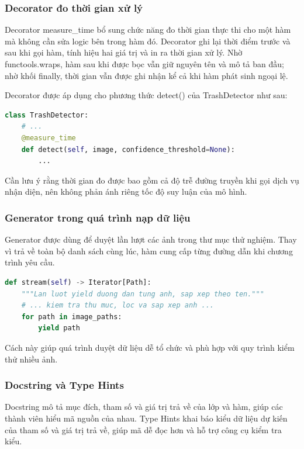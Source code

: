 \documentclass[a4paper,13pt]{extarticle}
\begin{document}
\subsubsection{ Decorator đo thời gian xử lý}

Decorator measure\_time bổ sung chức năng đo thời gian thực thi cho một hàm mà không cần sửa logic bên trong hàm đó. Decorator ghi lại thời điểm trước và sau khi gọi hàm, tính hiệu hai giá trị và in ra thời gian xử lý. Nhờ functools.wraps, hàm sau khi được bọc vẫn giữ nguyên tên và mô tả ban đầu; nhờ khối finally, thời gian vẫn được ghi nhận kể cả khi hàm phát sinh ngoại lệ.

Decorator được áp dụng cho phương thức detect() của TrashDetector như sau:

\begin{lstlisting}[language=Python, numbers=none, caption={Áp dụng Decorator measure\_time cho phương thức detect()}]
class TrashDetector:
    # ...
    @measure_time
    def detect(self, image, confidence_threshold=None):
        ...
\end{lstlisting}

Cần lưu ý rằng thời gian đo được bao gồm cả độ trễ đường truyền khi gọi dịch vụ nhận diện, nên không phản ánh riêng tốc độ suy luận của mô hình.
\subsubsection{Generator trong quá trình nạp dữ liệu}

Generator được dùng để duyệt lần lượt các ảnh trong thư mục thử nghiệm. Thay vì trả về toàn bộ danh sách cùng lúc, hàm cung cấp từng đường dẫn khi chương trình yêu cầu.

\begin{lstlisting}[language=Python, numbers=none, caption={Generator trong DataStreamer}]
def stream(self) -> Iterator[Path]:
    """Lan luot yield duong dan tung anh, sap xep theo ten."""
    # ... kiem tra thu muc, loc va sap xep anh ...
    for path in image_paths:
        yield path
\end{lstlisting}

Cách này giúp quá trình duyệt dữ liệu dễ tổ chức và phù hợp với quy trình kiểm thử nhiều ảnh.

\subsubsection{ Docstring và Type Hints}

Docstring mô tả mục đích, tham số và giá trị trả về của lớp và hàm, giúp các thành viên hiểu mã nguồn của nhau. Type Hints khai báo kiểu dữ liệu dự kiến của tham số và giá trị trả về, giúp mã dễ đọc hơn và hỗ trợ công cụ kiểm tra kiểu.
\end{document}
